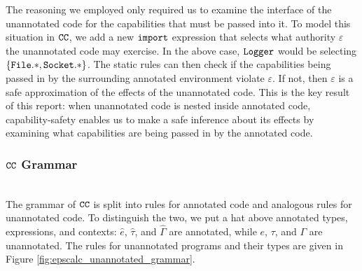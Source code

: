 The reasoning we employed only required us to examine the interface of the unannotated code for the capabilities that must be passed into it. To model this situation in $\mathtt{CC}$, we add a new $\mathtt{import}$ expression that selects what authority $\varepsilon$ the unannotated code may exercise. In the above case, $\mathtt{Logger}$ would be selecting $\{ \mathtt{File.*}, \mathtt{Socket.*} \}$. The static rules can then check if the capabilities being passed in by the surrounding annotated environment violate $\varepsilon$. If not, then $\varepsilon$ is a safe approximation of the effects of the unannotated code. This is the key result of this report: when unannotated code is nested inside annotated code, capability-safety enables us to make a safe inference about its effects by examining what capabilities are being passed in by the annotated code.\\

\subsubsection{$\mathtt{CC}$ Grammar}~\\

The grammar of $\mathtt{CC}$ is split into rules for annotated code and analogous rules for unannotated code. To distinguish the two, we put a hat above annotated types, expressions, and contexts: $\hat e$, $\hat \tau$, and $\hat \Gamma$ are annotated, while $e$, $\tau$, and $\Gamma$ are unannotated. The rules for unannotated programs and their types are given in Figure \ref{fig:epscalc_unannotated_grammar}.

